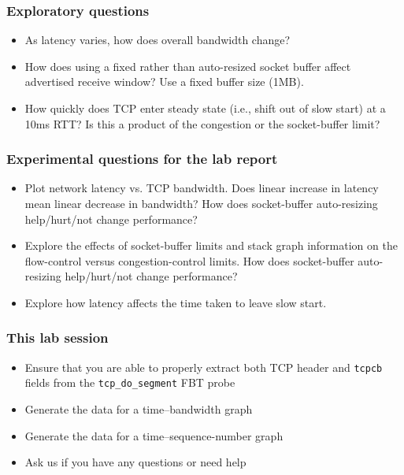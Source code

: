 \begin{frame}
  \frametitle{Exploratory questions}

  \begin{itemize}
    \item As latency varies, how does overall bandwidth change?
    \item How does using a fixed rather than auto-resized socket buffer affect
      advertised receive window?  Use a fixed buffer size (1MB).
    \item How quickly does TCP enter steady state (i.e., shift out of slow
      start) at a 10ms RTT?
      Is this a product of the congestion or the socket-buffer limit?
  \end{itemize}
\end{frame}

\begin{frame}
  \frametitle{Experimental questions for the lab report}

  \begin{itemize}
    \item Plot network latency vs. TCP bandwidth.
      Does linear increase in latency mean linear decrease in bandwidth?
      How does socket-buffer auto-resizing help/hurt/not change performance?
    \item Explore the effects of socket-buffer limits and stack graph
      information on the flow-control versus congestion-control limits.
      How does socket-buffer auto-resizing help/hurt/not change performance?
    \item Explore how latency affects the time taken to leave slow start.
  \end{itemize}
\end{frame}

\begin{frame}
  \frametitle{This lab session}

  \begin{itemize}
    \item Ensure that you are able to properly extract both TCP header and
      \texttt{tcpcb} fields from the \texttt{tcp\_do\_segment} FBT probe
    \item Generate the data for a time--bandwidth graph
    \item Generate the data for a time--sequence-number graph
    \item Ask us if you have any questions or need help
  \end{itemize}
\end{frame}


